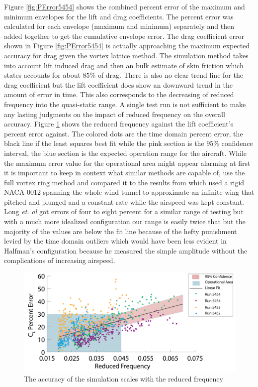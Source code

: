 \documentclass[11pt]{ucthesis}
\begin{document}
Figure \ref{fig:PError5454} shows the combined percent error of the maximum and minimum envelopes for the lift and drag coefficients. The percent error was calculated for each envelope (maximum and minimum) separately and then added together to get the cumulative envelope error. The drag coefficient error shown in Figure \ref{fig:PError5454} is actually approaching the maximum expected accuracy for drag given the vortex lattice method. The simulation method takes into account lift induced drag and then an bulk estimate of skin friction which \cite{thomas1985aircraft} states accounts for about $85\%$ of drag. There is also no clear trend line for the drag coefficient but the lift coefficient does show an downward trend in the amount of error in time. This also corresponds to the decreasing of reduced frequency into the quasi-static range. A single test run is not sufficient to make any lasting judgments on the impact of reduced frequency on the overall accuracy. Figure \ref{fig:RFreqvCLEr} shows the reduced frequency against the lift coefficient's percent error against. The colored dots are the time domain percent error, the black line if the least squares best fit while the pink section is the $95\%$ confidence interval, the blue section is the expected operation range for the aircraft. While the maximum error value for the operational area might appear alarming at first it is important to keep in context what similar methods are capable of, \cite{long2004object} use the full vortex ring method and compared it to the results from \cite{halfman1952experimental} which used a rigid NACA 0012 spanning the whole wind tunnel to approximate an infinite wing that pitched and plunged and a constant rate while the airspeed was kept constant. Long {\it et. al} got errors of four to eight percent for a similar range of testing but with a much more idealized configuration our range is easily twice that but the majority of the values are below the fit line because of the hefty punishment levied by the time domain outliers which would have been less evident in Halfman's configuration because he measured the simple amplitude without the complications of increasing airspeed. 

\begin{figure}[h]
\centering
\includegraphics[width=.75\linewidth]{Figures/ReducedFreqvCLPError-01.png}
\caption{The accuracy of the simulation scales with the reduced frequency}
\label{fig:RFreqvCLEr}
\end{figure}
\end{document}
